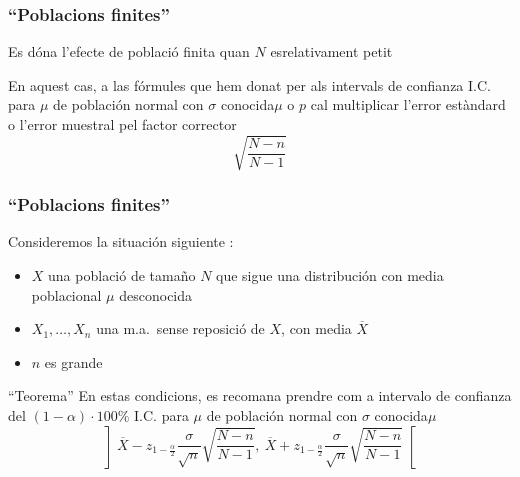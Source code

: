 \documentclass[12pt,t]{beamer}\usepackage[]{graphicx}\usepackage[]{color}
\renewcommand{\emph}[1]{{\color{red}#1}}
\theoremstyle{plain}
\theoremstyle{definition}
\begin{document}
\begin{frame}
\frametitle{``Poblacions finites''}

Es dóna l'efecte de \emph{població finita} quan $N$ esrelativament petit
\medskip

En aquest cas, a las fórmules que hem donat per als intervals de confianza  I.C. para $\mu$ de población normal con $\sigma$ conocida$\mu$ o $p$ cal multiplicar l'error estàndard o l'error muestral pel factor corrector
$$
\sqrt{\frac{N-n}{N-1}}
$$

\end{frame}

\begin{frame}
\frametitle{``Poblacions finites''}

Consideremos  la situación siguiente  :
\begin{itemize}
\item  $X$ una població de  tamaño  $N$ que sigue una distribución con media   poblacional $\mu$ desconocida

\item $X_1,\ldots,X_n$ una m.a.\ sense reposició de $X$, con media   $\overline{X}$

\item  $n$ es grande 
\end{itemize}

\begin{block}{``Teorema''}
En estas  condicions, es recomana prendre com a intervalo  de confianza  del $(1-\alpha)\cdot 100\%$ I.C. para $\mu$ de población normal con $\sigma$ conocida$\mu$
$$
\left]\overline{X}-z_{1-\frac{\alpha}{2}}\frac{\sigma}{\sqrt{n}}\sqrt{\frac{N-n}{N-1}},\
    \overline{X}+z_{1-\frac{\alpha}{2}}\frac{\sigma}{\sqrt{n}}\sqrt{\frac{N-n}{N-1}}\right[
$$
\end{block}



\end{frame}
\end{document}

